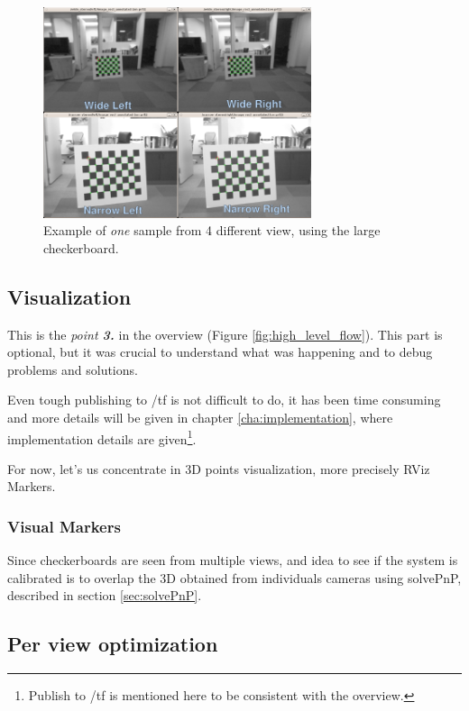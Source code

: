 \begin{figure}[!htbp]
 \centering
 \includegraphics[width=0.7\textwidth]{images/data_collection01.png}
 \caption{Example of \textit{one} sample from 4 different view, using the large checkerboard.}
 \label{fig:data_collection01}
\end{figure}




\subsection{Visualization}

This is the \textit{point \textbf{3.}} in the overview (Figure \ref{fig:high_level_flow}). This part is optional, but it was crucial to understand what was happening and to debug problems and solutions.

Even tough publishing to /tf is not difficult to do, it has been time consuming and more details will be given in chapter \ref{cha:implementation}, where implementation details are given\footnote{Publish to /tf is mentioned here to be consistent with the overview.}.

For now, let's us concentrate in 3D points visualization, more precisely RViz Markers.

\subsubsection{Visual Markers}

Since checkerboards are seen from multiple views, and idea to see if the system is calibrated is to overlap the 3D obtained from individuals cameras using solvePnP, described in section \ref{sec:solvePnP}.



\subsection{Per view optimization}

